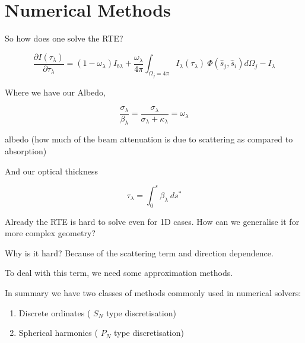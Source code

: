 \documentclass[12pt]{article}
\renewcommand{\_}{\kern-1.5pt\textunderscore\kern-1.5pt}
\begin{document}
\vspace{\baselineskip}
\section*{Numerical Methods}
So how does one solve the RTE?\par

 \[ \frac{ \partial I \left(  \tau_{ \lambda } \right) }{ \partial  \tau_{ \lambda }}= \left( 1- \omega _{ \lambda } \right)  I_{b \lambda }+\frac{ \omega _{ \lambda }}{4 \pi } \int _{ \Omega _{j}=4 \pi }^{}I_{ \lambda } \left(  \tau_{ \lambda } \right) ~ \Phi  \left( \hat{s}_{j},\hat{s}_{i} \right) d \Omega _{j}-I_{ \lambda } \] \par

Where we have our Albedo,\par

 \[ \frac{ \sigma _{ \lambda }}{ \beta _{ \lambda }}=\frac{ \sigma _{ \lambda }}{ \sigma _{ \lambda }+ \kappa _{ \lambda }}= \omega _{ \lambda } \] \par

albedo (how much of the beam attenuation is due to scattering as compared to absorption)\par

And our optical thickness\par

 \[  \tau_{ \lambda }= \int _{0}^{s} \beta _{ \lambda }~ds^{\ast} \] \par

Already the RTE is hard to solve even for 1D cases. How can we generalise it for more complex geometry?\par

Why is it hard? Because of the scattering term and direction dependence.\par


\vspace{\baselineskip}
To deal with this term, we need some approximation methods. \par

In summary we have two classes of methods commonly used in numerical solvers:\par

\begin{enumerate}
	\item Discrete ordinates ( \( S_{N} \)  type discretisation)\par

	\item Spherical harmonics ( \( P_{N} \)  type discretisation)
\end{enumerate}\par
\end{document}
